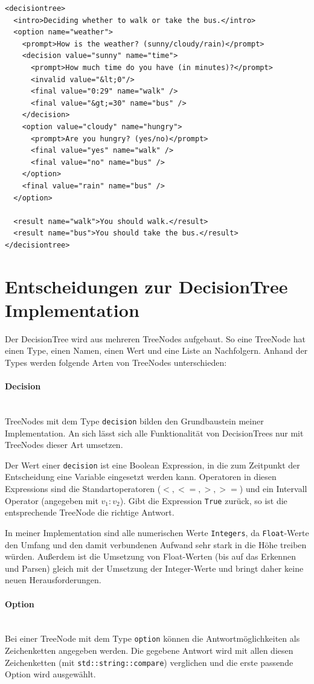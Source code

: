 \documentclass[a4paper,12pt]{article}
\newcommand{\myparagraph}[1]{\paragraph*{#1}\mbox{}\\}
\begin{document}
\begin{verbatim}
<decisiontree>
  <intro>Deciding whether to walk or take the bus.</intro>
  <option name="weather">
    <prompt>How is the weather? (sunny/cloudy/rain)</prompt>
    <decision value="sunny" name="time">
      <prompt>How much time do you have (in minutes)?</prompt>
      <invalid value="&lt;0"/>
      <final value="0:29" name="walk" />
      <final value="&gt;=30" name="bus" />
    </decision>
    <option value="cloudy" name="hungry">
      <prompt>Are you hungry? (yes/no)</prompt>
      <final value="yes" name="walk" />
      <final value="no" name="bus" />
    </option>
    <final value="rain" name="bus" />
  </option>

  <result name="walk">You should walk.</result>
  <result name="bus">You should take the bus.</result>
</decisiontree>
\end{verbatim}

\newpage
\section*{Entscheidungen zur DecisionTree Implementation}
Der DecisionTree wird aus mehreren TreeNodes aufgebaut. So eine TreeNode hat einen Type, einen Namen, einen Wert und eine Liste an Nachfolgern. Anhand der Types werden folgende Arten von TreeNodes unterschieden:

\myparagraph{Decision}
TreeNodes mit dem Type \texttt{decision} bilden den Grundbaustein meiner Implementation. An sich lässt sich alle Funktionalität von DecisionTrees nur mit TreeNodes dieser Art umsetzen.

Der Wert einer \texttt{decision} ist eine Boolean Expression, in die zum Zeitpunkt der Entscheidung eine Variable eingesetzt werden kann. Operatoren in diesen Expressions sind die Standartoperatoren ($<, <=, >, >=$) und ein Intervall Operator (angegeben mit $v_1:v_2$). Gibt die Expression \texttt{True} zurück, so ist die entsprechende TreeNode die richtige Antwort.

In meiner Implementation sind alle numerischen Werte \texttt{Integers}, da \texttt{Float}-Werte den Umfang und den damit verbundenen Aufwand sehr stark in die Höhe treiben würden.
Außerdem ist die Umsetzung von Float-Werten (bis auf das Erkennen und Parsen) gleich mit der Umsetzung der Integer-Werte und bringt daher keine neuen Herausforderungen. 

\myparagraph{Option}
Bei einer TreeNode mit dem Type \texttt{option} können die Antwortmöglichkeiten als Zeichenketten angegeben werden. Die gegebene Antwort wird mit allen diesen Zeichenketten (mit \texttt{std::string::compare}) verglichen und die erste passende Option wird ausgewählt.
\end{document}
